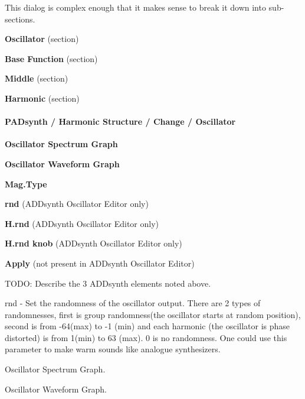    This dialog is complex enough that it makes sense to break it down into
   sub-sections.

   \begin{enumber}
      \item \textbf{Oscillator} (section)
      \item \textbf{Base Function} (section)
      \item \textbf{Middle} (section)
      \item \textbf{Harmonic} (section)
   \end{enumber}

\paragraph{PADsynth / Harmonic Structure / Change / Oscillator}
\label{paragraph:padsynth_harmonic_structure_change_oscillator}

   \begin{enumber}
      \item \textbf{Oscillator Spectrum Graph}
      \item \textbf{Oscillator Waveform Graph}
      \item \textbf{Mag.Type}
      \item \textbf{rnd} (ADDsynth Oscillator Editor only)
      \item \textbf{H.rnd} (ADDsynth Oscillator Editor only)
      \item \textbf{H.rnd knob} (ADDsynth Oscillator Editor only)
      \item \textbf{Apply} (not present in ADDsynth Oscillator Editor)
   \end{enumber}

   TODO:  Describe the 3 ADDsynth elements noted above.

   rnd - Set the randomness of the oscillator output. There are 2 types of
   randomnesses, first is group randomness(the oscillator starts at random
   position), second is from -64(max) to -1 (min) and each harmonic
   (the oscillator is phase distorted) is from 1(min) to 63 (max). 0 is no
   randomness. One could use this parameter to make warm sounds like
   analogue synthesizers.

   \setcounter{ItemCounter}{0}      %

   Oscillator Spectrum Graph.

   Oscillator Waveform Graph.

